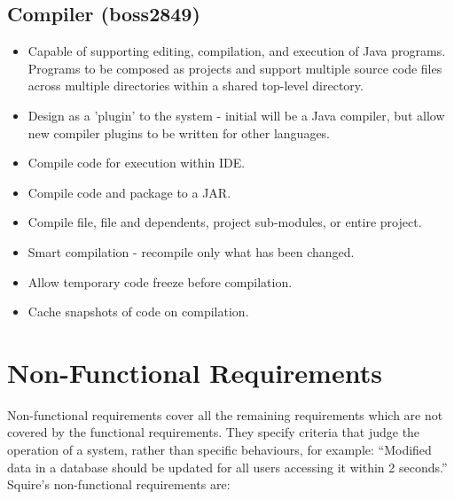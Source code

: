\documentclass[11pt]{report}
\begin{document}
    \subsection{Compiler (boss2849)}
        \begin{itemize}
            \item Capable of supporting editing, compilation, and execution of Java programs. Programs to be composed as projects and support multiple source code files across multiple directories within a shared top-level directory.
            \item Design as a 'plugin' to the system - initial will be a Java compiler, but allow new compiler plugins to be written for other languages.
            \item Compile code for execution within IDE.
            \item Compile code and package to a JAR.
            \item Compile file, file and dependents, project sub-modules, or entire project.
            \item Smart compilation - recompile only what has been changed. 
            \item Allow temporary code freeze before compilation.
            \item Cache snapshots of code on compilation. 
        \end{itemize}
    
\section{Non-Functional Requirements}
    Non-functional requirements cover all the remaining requirements which are not covered by the functional requirements. They specify criteria that judge the operation of a system, rather than specific behaviours, for example: ``Modified data in a database should be updated for all users accessing it within 2 seconds.'' Squire's non-functional requirements are:
    
\end{document}
